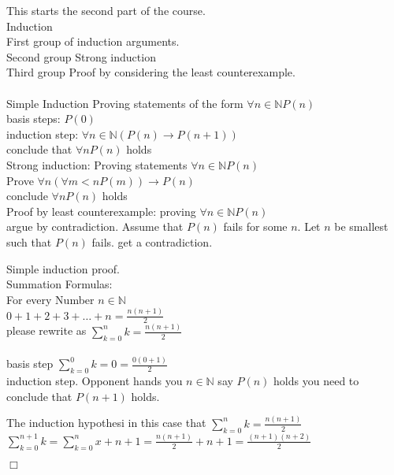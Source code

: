 \documentclass[12pt]{article}
\begin{document}
\maketitle

This starts the second part of the course.\\
Induction \\
First group of induction arguments. \\
Second group Strong induction \\
Third group Proof by considering the least counterexample. \\
\\Simple Induction Proving statements of the form $\forall n \in \mathbb{N} P(n)$
\\basis steps: $P(0)$
\\induction step: $\forall n \in \mathbb{N} (P(n) \rightarrow P(n+1))$
\\conclude that  $ \forall n P(n)$ holds
\\Strong induction: Proving statements $\forall n \in \mathbb{N} P(n)$
\\Prove $\forall n ( \forall m < n P(m)) \rightarrow P(n)$
\\conclude $\forall n P(n) $ holds\\

Proof by least counterexample: proving $\forall n \in \mathbb{N} P(n)$\\
argue by contradiction.
Assume that $P(n)$ fails for some $n$.
Let $n$ be smallest such that $P(n)$ fails. get a contradiction.


Simple induction proof.\\
Summation Formulas:
\\  For every Number $n \in \mathbb{N}$
\\ $0+1+2+3+\dots+n = \frac{n(n+1)}{2}$
\\please rewrite as $\sum_{k=0}^{n} k = \frac{n(n+1)}{2}$
\\ 
\\ basis step $\sum_{k=0}^{0} k = 0 = \frac{0(0+1)}{2}$
\\ induction step. Opponent hands you $n  \in \mathbb{N}$
say $P(n)$ holds you need to conclude that $P(n+1)$ holds.

The induction hypothesi in this case that 
$\sum_{k=0}^{n} k = \frac{n(n+1)}{2}$
$\sum_{k=0}^{n+1}k = \sum_{k=0}^{n}x +n+1 = \frac{n(n+1)}{2}+n+1 = \frac{(n+1)(n+2)}{2}$\\
\begin{flushright}
        $\Box$
\end{flushright}
\end{document}
